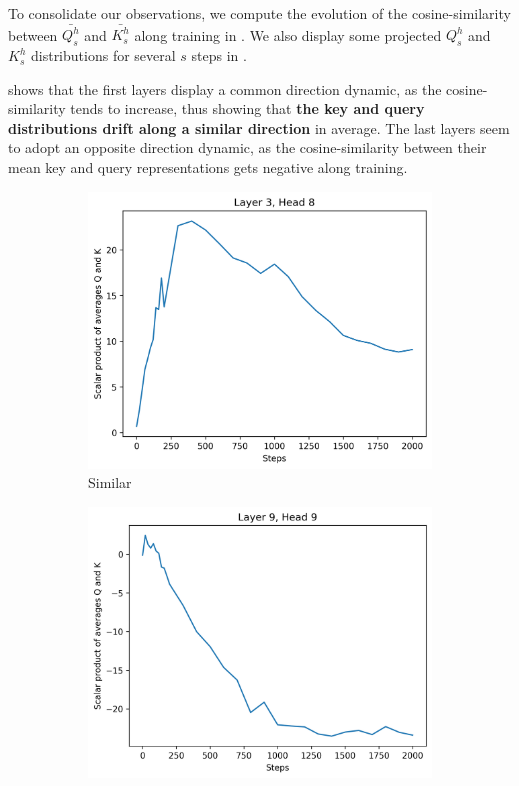 To consolidate our observations, we compute the evolution of the cosine-similarity between $\bar{Q^h_s}$ and $\bar{K^h_s}$ along training in . We also display some projected $Q^h_s$ and $K^h_s$ distributions for several $s$ steps in .

 shows that the first layers display a common direction dynamic, as the cosine-similarity tends to increase, thus showing that \textbf{the key and query distributions drift along a similar direction} in average. The last layers seem to adopt an opposite direction dynamic, as the cosine-similarity between their mean key and query representations gets negative along training.

\begin{figure}[ht]
    \centering
    \begin{subfigure}[b]{0.43\columnwidth}
         \includegraphics[width=\linewidth]{sources/part_1/anisotropy/imgs/l3h8_scalar_QK.png}
         \caption{Similar}
         \label{fig:scalar_sim}
    \end{subfigure}
    \hfill
    \begin{subfigure}[b]{0.43\columnwidth}
         \includegraphics[width=\linewidth]{sources/part_1/anisotropy/imgs/l9h9_scalar_QK.png}

\end{subfigure}
\end{figure}
